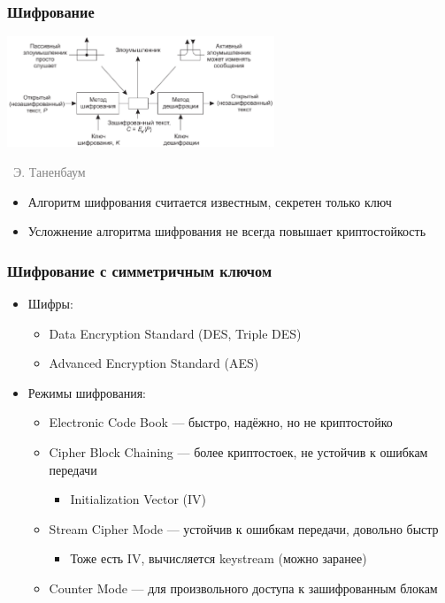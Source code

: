 \documentclass[xetex,mathserif,serif]{beamer}
\newcommand{\attribution}[1] {
\vspace{-5mm}\begin{flushright}\begin{scriptsize}\textcolor{gray}{\textcopyright\, #1}\end{scriptsize}\end{flushright}
}
\begin{document}
	\begin{frame}
		\frametitle{Шифрование}
		\begin{center}
			\includegraphics[width=0.6\textwidth]{cryptography.png}
			\attribution{Э. Таненбаум}
		\end{center}
		\begin{itemize}
			\item Алгоритм шифрования считается известным, секретен только ключ
			\item Усложнение алгоритма шифрования не всегда повышает криптостойкость
		\end{itemize}
	\end{frame}

	\begin{frame}
		\frametitle{Шифрование с симметричным ключом}
		\begin{itemize}
			\item Шифры:
			\begin{itemize}
				\item Data Encryption Standard (DES, Triple DES)
				\item Advanced Encryption Standard (AES)
			\end{itemize}
			\item Режимы шифрования:
			\begin{itemize}
				\item Electronic Code Book --- быстро, надёжно, но не криптостойко
				\item Cipher Block Chaining --- более криптостоек, не устойчив к ошибкам передачи
				\begin{itemize}
					\item Initialization Vector (IV)
				\end{itemize}
				\item Stream Cipher Mode --- устойчив к ошибкам передачи, довольно быстр
				\begin{itemize}
					\item Тоже есть IV, вычисляется keystream (можно заранее)
				\end{itemize}
				\item Counter Mode --- для произвольного доступа к зашифрованным блокам
			\end{itemize}
		\end{itemize}
	\end{frame}
\end{document}
